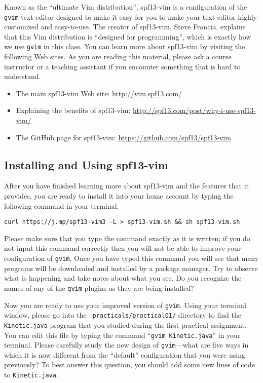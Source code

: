 Known as the ``ultimate Vim distribution'', spf13-vim is a configuration of the {\tt gvim} text editor designed to make it
easy for you to make your text editor highly-customized and easy-to-use.  The creator of spf13-vim, Steve Francia,
explains that this Vim distribution is ``designed for programming'', which is exactly how we use {\tt gvim} in this class. You
can learn more about spf13-vim by visiting the following Web sites.  As you are reading this material, please ask a
course instructor or a teaching assistant if you encounter something that is hard to understand.

\vspace*{-.1in}
\begin{itemize}
  \setlength{\itemsep}{.01in}
  \item The main spf13-vim Web site: \url{http://vim.spf13.com/}
  \item Explaining the benefits of spf13-vim: \url{http://spf13.com/post/why-i-use-spf13-vim/}
  \item The GitHub page for spf13-vim: \url{https://github.com/spf13/spf13-vim}
\end{itemize}

\vspace*{-.30in}
\subsection*{Installing and Using spf13-vim} 
\vspace*{-.05in}

After you have finished learning more about spf13-vim and the features that it provides, you are ready to install it
into your home account by typing the following command in your terminal.

\begin{code}
  {\tt curl https://j.mp/spf13-vim3 -L > spf13-vim.sh \&\& sh spf13-vim.sh}
\end{code}

Please make sure that you type the command exactly as it is written; if you do not input this command correctly then you
will not be able to improve your configuration of {\tt gvim}. Once you have typed this command you will see that many
programs will be downloaded and installed by a package manager.  Try to observe what is happening and take notes about
what you see. Do you recognize the names of any of the {\tt gvim} plugins as they are being installed?

Now you are ready to use your improved version of {\tt gvim}.  Using your terminal window, please go into the {\tt
practicals/practical01/} directory to find the {\tt Kinetic.java} program that you studied during the first practical
assignment. You can edit this file by typing the command ``{\tt gvim Kinetic.java}'' in your terminal. Please carefully
study the new design of {\tt gvim}---what are five ways in which it is now different from the ``default'' configuration that
you were using previously? To best answer this question, you should add
some new lines of code to {\tt Kinetic.java}.

